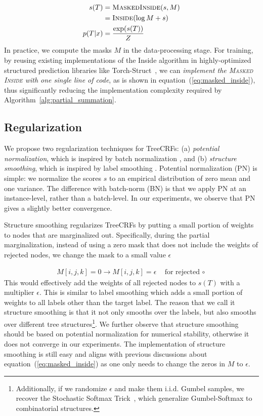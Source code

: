 \begin{align}
  s(T) &= \textsc{MaskedInside}(s, M) \nonumber \\
  &= \textsc{Inside}( \log M + s) \label{eq:masked_inside}\\ 
  p(T | x) &= \frac{\exp(s(T))}{Z} \label{eq:log_prob_efficient}
\end{align}
In practice, we compute the masks $M$ in the data-processing stage.
For training, by reusing existing implementations of the Inside algorithm in highly-optimized structured prediction libraries like Torch-Struct~\citep{Rush2020TorchStructDS},
we can \textit{implement the \textsc{Masked Inside} with one single line of code}, as is shown in equation~(\ref{eq:masked_inside}), thus significantly reducing the implementation complexity required by Algorithm~\ref{alg:partial_summation}. 





\subsection{Regularization} 
\label{ssec:regularization}
We propose two regularization techniques for TreeCRFs: (a)
\textit{potential normalization}, which is inspired by batch normalization \citep{Ioffe2015BatchNA}, and (b) \textit{structure smoothing}, which is inspired by label smoothing  \citep{Mller2019WhenDL}. 
Potential normalization (PN) is simple: we normalize the scores $s$ to an empirical distribution of zero mean and one variance. 
The difference with batch-norm (BN) is that we apply PN at an instance-level, rather than a batch-level. 
In our experiments, we observe that PN gives a slightly better convergence. 

Structure smoothing regularizes TreeCRFs by putting a small portion of weights to nodes that are marginalized out. 
Specifically, during the partial marginalization, instead of using a zero mask that does not include the weights of rejected nodes, we change the mask to a small value $\epsilon$

\begin{align}
  M[i, j, k] = 0 \to M[i, j, k] = \epsilon \quad \text{for rejected $\circ$}
\end{align}
This would effectively add the weights of all rejected nodes to $s(T)$ with a multiplier $\epsilon$. 
This is similar to label smoothing which adds a small portion of weights to all labels other than the target label. 
The reason that we call it structure smoothing is that it not only smooths over the labels, but also smooths over different tree structures\footnote{Additionally, if we randomize $\epsilon$ and make them i.i.d. Gumbel samples, we recover the Stochastic Softmax Trick~\citep{paulus2020gradient}, which generalize Gumbel-Softmax to combinatorial structures.}. 
We further observe that structure smoothing should be based on potential normalization for numerical stability, otherwise it does not converge in our experiments. 
The implementation of structure smoothing is still easy and aligns with previous discussions about equation~(\ref{eq:masked_inside})
as one only needs to change the zeros in $M$ to $\epsilon$. 





